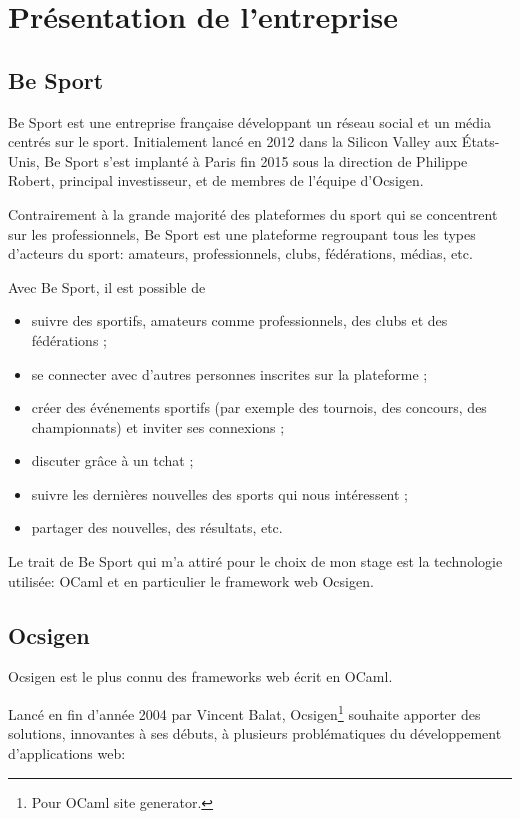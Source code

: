 \section{Présentation de l'entreprise}

\subsection{Be Sport}

Be Sport\cite{besport} est une entreprise française développant un réseau social
et un média centrés sur le sport. Initialement lancé en 2012 dans la Silicon
Valley aux États-Unis, Be Sport s'est implanté à Paris fin 2015 sous la
direction de Philippe Robert, principal investisseur, et de membres de l'équipe d'Ocsigen.

Contrairement à la grande majorité des plateformes du sport qui se concentrent
sur les professionnels, Be Sport est une plateforme regroupant tous les
types d'acteurs du sport: amateurs, professionnels, clubs, fédérations, médias,
etc.

Avec Be Sport, il est possible de

\begin{itemize}
  \item suivre des sportifs, amateurs comme professionnels, des clubs et des
    fédérations ;
  \item se connecter avec d'autres personnes inscrites sur la plateforme ;
  \item créer des événements sportifs (par exemple des tournois, des concours,
    des championnats) et inviter ses connexions ;
  \item discuter grâce à un tchat ;
  \item suivre les dernières nouvelles des sports qui nous intéressent ;
  \item partager des nouvelles, des résultats, etc.
\end{itemize}

Le trait de Be Sport qui m'a attiré pour le choix de mon stage est la
technologie utilisée: OCaml et en particulier le framework web Ocsigen.

\subsection{Ocsigen}

Ocsigen\cite{ocsigen-website} est le plus connu des frameworks web écrit en
OCaml.

Lancé en fin d'année 2004 par Vincent Balat, Ocsigen\footnote{Pour OCaml site
  generator.} souhaite apporter des solutions, innovantes à ses débuts, à
plusieurs problématiques du développement d'applications web:

